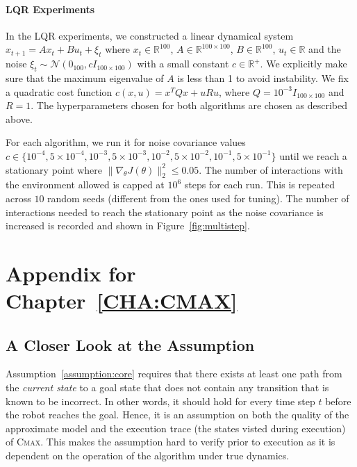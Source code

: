 \paragraph{LQR Experiments}
\label{sec:lqr-experiments}

In the LQR experiments, we constructed a linear dynamical system
$x_{t+1} = Ax_t + Bu_t + \xi_t$ where $x_t \in \mathbb{R}^{100}$, $A \in \mathbb{R}^{100\times
  100}$, $B \in \mathbb{R}^{100}$, $u_t \in
\mathbb{R}$ and the noise $\xi_t \sim \mathcal{N}(0_{100}, cI_{100
  \times 100})$ with a small constant $c \in \mathbb{R}^+$. We
explicitly make sure that the maximum eigenvalue of $A$ is less than 1
to avoid instability. We fix a quadratic cost function $c(x, u) =
x^TQx + uRu$, where $Q = 10^{-3}I_{100 \times 100}$ and $R = 1$. The
hyperparameters chosen for both algorithms are chosen as described
above.

For each algorithm, we run it for noise covariance values $c \in
\{10^{-4}, 5\times 10^{-4}, 10^{-3}, 5\times 10^{-3}, 10^{-2}, 5\times 10^{-2},
10^{-1}, 5\times 10^{-1}\}$
until we reach a stationary point where $\|\nabla_\theta
J(\theta)\|_2^2 \leq 0.05$. The number of interactions with the
environment allowed is capped at $10^6$ steps for each run. This is
repeated across $10$ random seeds (different from the ones used for
tuning). The number of interactions needed to reach the stationary
point as the noise covariance is increased is recorded and shown in
Figure~\ref{fig:multistep}.
\clearpage
\newpage
\section{Appendix for Chapter~\ref{CHA:CMAX}}
\label{sec:append-chapt-cmax}

\subsection{A Closer Look at the Assumption}
\label{sec:closer-look-at}

Assumption~\ref{assumption:core} requires that there exists at least
one path from the \textit{current state} to a goal state that does not
contain any transition that is known to be incorrect. In other words, it should
hold for every time step $t$ before the robot reaches the goal. Hence,
it is an assumption on both the quality of the approximate model and
the execution trace (the states visted during execution) of
\textsc{Cmax}. This makes the assumption hard to verify prior to
execution as it is
dependent on the operation of the algorithm under true dynamics.

